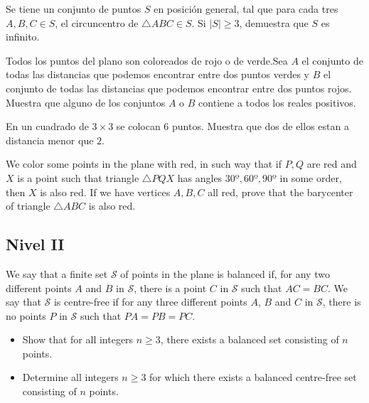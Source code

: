 \documentclass[11pt]{scrartcl}
\begin{document}
\begin{problem}
    Se tiene un conjunto de puntos $ S $ en posición general, tal que para cada tres $A,B,C \in S$, el circuncentro de $\triangle ABC \in S$. Si $|S|\geq 3$, demuestra que $S$ es infinito.
\end{problem}

\begin{problem}
    Todos los puntos del plano son coloreados de rojo o de verde.Sea $A$ el conjunto de
todas las distancias que podemos encontrar entre dos puntos verdes y $B$ el conjunto
de todas las distancias que podemos encontrar entre dos puntos rojos. Muestra
que alguno de los conjuntos $A$ o $B$ contiene a todos los reales positivos.
\end{problem}

\begin{problem}
    En un cuadrado de $3\times 3$ se colocan 6 puntos. Muestra que dos de ellos estan a distancia menor que $2$.
\end{problem}

\begin{problem}  [Ibero 2024/4]
    We color some points in the plane with red, in such way that if $P,Q$ are red and $X$ is a point such that triangle $\triangle PQX$ has angles $30º, 60º, 90º$ in some order, then $X$ is also red. If we have vertices $A, B, C$ all red, prove that the barycenter of triangle $\triangle ABC$ is also red.
\end{problem}


\subsection{Nivel II}
\begin{problem} [IMO 2015/1]
    We say that a finite set $\mathcal{S}$ of points in the plane is balanced if, for any two different points $A$ and $B$ in $\mathcal{S}$, there is a point $C$ in $\mathcal{S}$ such that $AC=BC$. We say that $\mathcal{S}$ is centre-free if for any three different points $A$, $B$ and $C$ in $\mathcal{S}$, there is no points $P$ in $\mathcal{S}$ such that $PA=PB=PC$.
\begin{itemize}
   
\item  Show that for all integers $n\ge 3$, there exists a balanced set consisting of $n$ points.

\item Determine all integers $n\ge 3$ for which there exists a balanced centre-free set consisting of $n$ points.
  
\end{itemize}
\end{problem}
\end{document}
